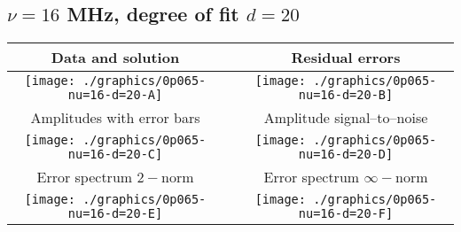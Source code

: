 

% 

\clearpage{}
\break{}

\subsection{$\nu = 16$ MHz, degree of fit $d = 20$}

\begin{table}[h]
    \begin{center}
        \begin{tabular}{ccc}
            Data and solution & \quad & Residual errors \\\hline
            \texttt{[image: ./graphics/0p065-nu=16-d=20-A]} &&
            \texttt{[image: ./graphics/0p065-nu=16-d=20-B]} \\[15pt]
            Amplitudes with error bars && Amplitude signal--to--noise \\\hline
            \texttt{[image: ./graphics/0p065-nu=16-d=20-C]} &&
            \texttt{[image: ./graphics/0p065-nu=16-d=20-D]} \\[15pt]
            Error spectrum $2-$norm && Error spectrum $\infty-$norm \\\hline
            \texttt{[image: ./graphics/0p065-nu=16-d=20-E]} &&
            \texttt{[image: ./graphics/0p065-nu=16-d=20-F]} \\[15pt]
        \end{tabular}
    \end{center}
\label{fig:elev=65, nu=16}
\end{table}



\endinput
